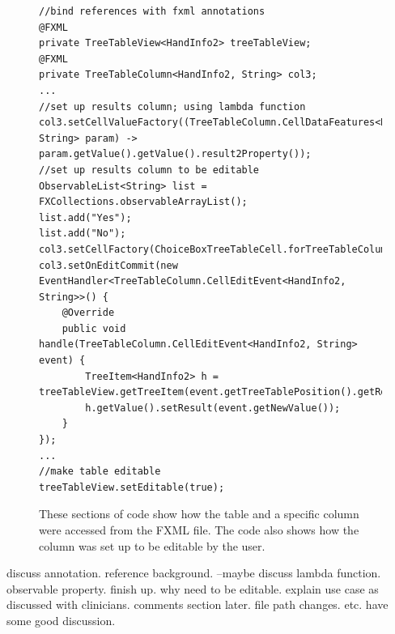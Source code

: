 \begin{figure}[H]
\centering
\begin{lstlisting}
//bind references with fxml annotations
@FXML
private TreeTableView<HandInfo2> treeTableView;
@FXML
private TreeTableColumn<HandInfo2, String> col3;
...
//set up results column; using lambda function
col3.setCellValueFactory((TreeTableColumn.CellDataFeatures<HandInfo2, String> param) -> param.getValue().getValue().result2Property());
//set up results column to be editable
ObservableList<String> list = FXCollections.observableArrayList();
list.add("Yes");
list.add("No");
col3.setCellFactory(ChoiceBoxTreeTableCell.forTreeTableColumn(list));
col3.setOnEditCommit(new EventHandler<TreeTableColumn.CellEditEvent<HandInfo2, String>>() {
	@Override
	public void handle(TreeTableColumn.CellEditEvent<HandInfo2, String> event) {
		TreeItem<HandInfo2> h = treeTableView.getTreeItem(event.getTreeTablePosition().getRow());
		h.getValue().setResult(event.getNewValue());
	}
});
...
//make table editable
treeTableView.setEditable(true);
\end{lstlisting}
\caption[TreeTableView Editable Results Column]{These sections of code show how the table and a specific column were accessed from the FXML file. The code also shows how the column was set up to be editable by the user.}
\label{fig:tabularDataCode}
\end{figure}







discuss annotation. reference background. --maybe
discuss lambda function. observable property. finish up. why need to be editable. explain use case as discussed with clinicians. comments section later. file path changes. etc. have some good discussion. 

